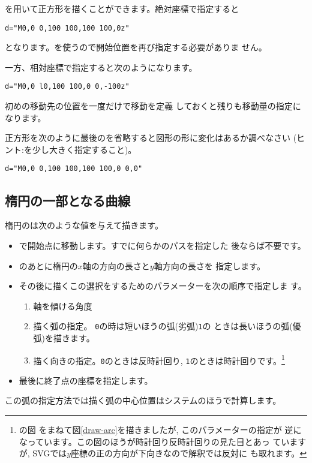 を用いて正方形を描くことができます。絶対座標で指定すると
\begin{center}
 \texttt{d="M0,0 0,100 100,100 100,0z"}
\end{center}
となります。を使うので開始位置を再び指定する必要がありま
せん。

一方、相対座標で指定すると次のようになります。
\begin{center}
 \texttt{d="M0,0 l0,100 100,0 0,-100z"}
\end{center}
初めの移動先の位置を一度だけで移動を定義
しておくと残りも移動量の指定になります。
\begin{Problem}\upshape
正方形を次のように最後のを省略すると図形の形に変化はあるか調べなさい
(ヒント:を少し大きく指定すること)。
\begin{center}
 \texttt{d="M0,0 0,100 100,100 100,0 0,0"}
\end{center}
\end{Problem}
%
\ifSeminor
\else
\subsection{楕円の一部となる曲線}
楕円のは次のような値を与えて描きます。
\begin{itemize}
 \item {}で開始点に移動します。すでに何らかのパスを指定した
       後ならば不要です。
 \item {}のあとに楕円の$x$軸の方向の長さと$y$軸方向の長さを
       指定します。
 \item その後に描くこの選択をするためのパラメーターを次の順序で指定しま
       す。
\begin{enumerate}
 \item 軸を傾ける角度
 \item 描く弧の指定。 \texttt{0}の時は短いほうの弧(劣弧)\texttt{1}の
       ときは長いほうの弧(優弧)を描きます。
 \item 描く向きの指定。\texttt{0}のときは反時計回り,
       \texttt{1}のときは時計回りです。\footnote{\cite[p.135]{Cagle}の図
       をまねて図\ref{draw-arc}を描きましたが, このパラメーターの指定が
       逆になっています。この図のほうが時計回り反時計回りの見た目とあっ
       ていますが, SVGでは$y$座標の正の方向が下向きなので解釈では反対に
       も取れます。}
\end{enumerate}
 \item 最後に終了点の座標を指定します。
\end{itemize}
この弧の指定方法では描く弧の中心位置はシステムのほうで計算します。

